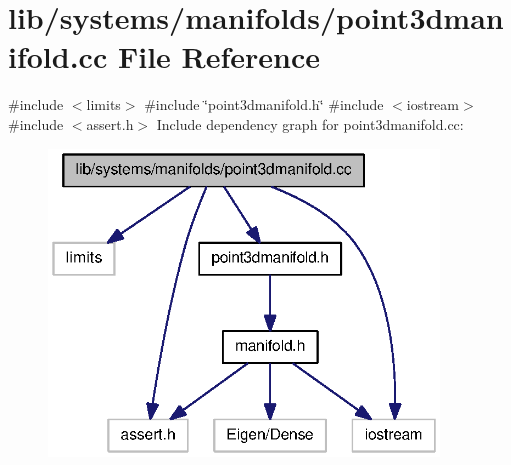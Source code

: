 \section{lib/systems/manifolds/point3dmanifold.cc \-File \-Reference}
\label{point3dmanifold_8cc}
{\ttfamily \#include $<$limits$>$}\*
{\ttfamily \#include \char`\"{}point3dmanifold.\-h\char`\"{}}\*
{\ttfamily \#include $<$iostream$>$}\*
{\ttfamily \#include $<$assert.\-h$>$}\*
\-Include dependency graph for point3dmanifold.\-cc\-:\nopagebreak
\begin{figure}[H]
\begin{center}
\leavevmode
\includegraphics[width=294pt]{point3dmanifold_8cc__incl}
\end{center}
\end{figure}

